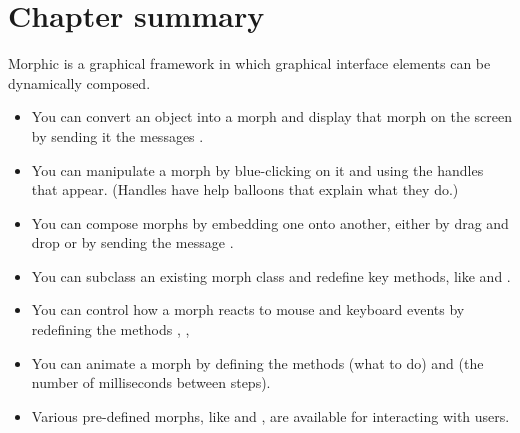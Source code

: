 \documentclass[a4paper,10pt,twoside]{book}
\begin{document}
\section{Chapter summary}

Morphic is a graphical framework in which graphical interface elements can be dynamically composed.

\begin{itemize}
  \item You can convert an object into a morph and display that morph on the screen by sending it the messages .
  \item You can manipulate a morph by blue-clicking on it and using the handles that appear. (Handles have help balloons that explain what they do.)
  \item You can compose morphs by embedding one onto another, either by drag and drop or by sending the message .
  \item You can subclass an existing morph class and redefine key methods, like  and .
  \item You can control how a morph reacts to mouse and keyboard events by redefining the methods , , \etc
  \item You can animate a morph by defining the methods  (what to do) and  (the number of milliseconds between steps).
  \item Various pre-defined morphs, like  and , are available for interacting with users.
\end{itemize}

\ifx\wholebook\relax\else
\end{document}
